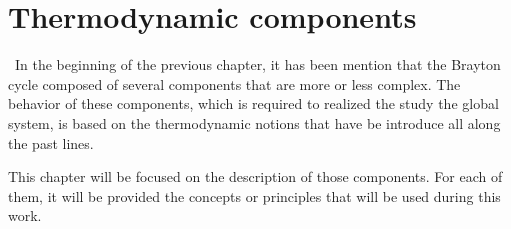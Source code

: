 \graphicspath{{Chapter_3_-_Thermodynamic_components/Images/}}
\chapter{Thermodynamic components}
\quad\, In the beginning of the previous chapter, it has been mention that the Brayton cycle composed of several components that are more or less complex. The behavior of these components, which is required to realized the study the global system, is based on the thermodynamic notions that have be introduce all along the past lines.

This chapter will be focused on the description of those components. For each of them, it will be provided the concepts or principles that will be used during this work. 

\newpage

\newpage



